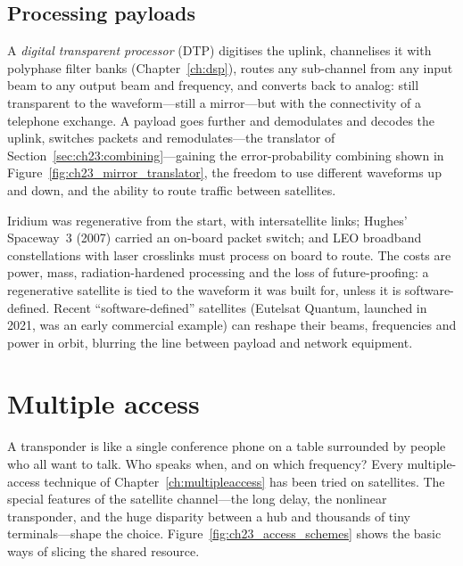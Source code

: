 \subsection{Processing payloads}

A \emph{digital transparent processor} (DTP) digitises the uplink, channelises it with polyphase
filter banks (Chapter~\ref{ch:dsp}), routes any sub-channel from any input beam to any output
beam and frequency, and converts back to analog: still transparent to the waveform---still a
mirror---but with the connectivity of a telephone exchange. A  payload goes
further and demodulates and decodes the uplink, switches packets and remodulates---the translator
of Section~\ref{sec:ch23:combining}---gaining the error-probability combining shown in
Figure~\ref{fig:ch23_mirror_translator}, the freedom to use different waveforms up and down, and
the ability to route traffic between satellites.

Iridium was regenerative from the start, with intersatellite links; Hughes' Spaceway~3 (2007)
carried an on-board packet switch; and LEO broadband constellations with laser crosslinks must
process on board to route. The costs are power, mass, radiation-hardened processing and the loss
of future-proofing: a regenerative satellite is tied to the waveform it was built for, unless it
is software-defined. Recent ``software-defined'' satellites (Eutelsat Quantum, launched in 2021,
was an early commercial example) can reshape their beams, frequencies and power in orbit, blurring
the line between payload and network equipment.


\section{Multiple access}
\label{sec:ch23:access}

A transponder is like a single conference phone on a table surrounded by people who all want to
talk. Who speaks when, and on which frequency? Every multiple-access technique of
Chapter~\ref{ch:multipleaccess} has been tried on satellites. The special features of the satellite
channel---the long delay, the nonlinear transponder, and the huge disparity between a hub and
thousands of tiny terminals---shape the choice. Figure~\ref{fig:ch23_access_schemes} shows the
basic ways of slicing the shared resource.


